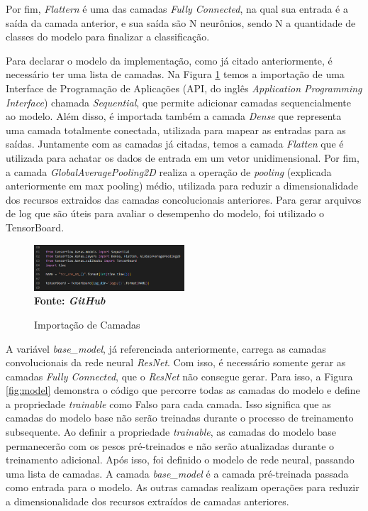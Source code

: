 Por fim, \textit{Flattern} é uma das camadas \textit{Fully Connected}, na qual sua entrada é a saída da camada anterior, e sua saída são N neurônios, sendo N a quantidade de classes do modelo para finalizar a classificação.


Para declarar o modelo da implementação, como já citado anteriormente, é necessário ter uma lista de camadas. Na Figura \ref{fig:layers} temos a importação de uma Interface de Programação de Aplicações (API, do inglês \textit{Application Programming Interface}) chamada \textit{Sequential}, que permite adicionar camadas sequencialmente ao modelo. Além disso, é importada também a camada \textit{Dense} que representa uma camada totalmente conectada, utilizada para mapear as entradas para as saídas. Juntamente com as camadas já citadas, temos a camada \textit{Flatten} que é utilizada para achatar os dados de entrada em um vetor unidimensional. Por fim, a camada \textit{GlobalAveragePooling2D} realiza a operação de \textit{pooling} (explicada anteriormente em max pooling) médio, utilizada para reduzir a dimensionalidade dos recursos extraidos das camadas concolucionais anteriores. Para gerar arquivos de log que são úteis para avaliar o desempenho do modelo, foi utilizado o TensorBoard.


\begin{figure}[ht]
 	\centering	
 	\caption[\hspace{0.1cm}Grade Computacional.]{Importação de Camadas}
 	\vspace{-0.4cm}
 	\includegraphics[width=0.5\textwidth]{figuras/layers.png}
 	\captionsetup{justification=centering}
	\vspace{-0.2cm}
     \\\textbf{\footnotesize Fonte: \textit{GitHub}}
	\label{fig:layers}
\end{figure}


A variável \textit{base\_model}, já referenciada anteriormente, carrega as camadas convolucionais da rede neural \textit{ResNet}. Com isso, é necessário somente gerar as camadas \textit{Fully Connected}, que o \textit{ResNet} não consegue gerar. Para isso, a Figura \ref{fig:model} demonstra o código que percorre todas as camadas do modelo e define a propriedade \textit{trainable} como Falso para cada camada. Isso significa que as camadas do modelo base não serão treinadas durante o processo de treinamento subsequente. Ao definir a propriedade \textit{trainable}, as camadas do modelo base permanecerão com os pesos pré-treinados e não serão atualizadas durante o treinamento adicional. Após isso, foi definido o modelo de rede neural, passando uma lista de camadas. A camada \textit{base\_model} é a camada pré-treinada passada como entrada para o modelo. As outras camadas realizam operações para reduzir a dimensionalidade dos recursos extraídos de camadas anteriores.

